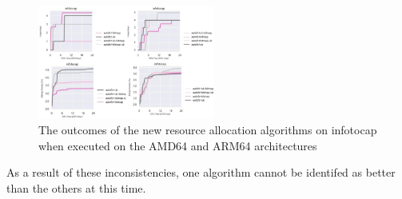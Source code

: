 \begin{figure}

    \includegraphics[width=0.52\textwidth]{figs/infotocap_algo_compare.png}
    \centering
    \caption{The outcomes of the new resource allocation algorithms on infotocap when executed on the AMD64 and ARM64 architectures}
    \label{figs:infotocap_algo_compare.png}
\end{figure}

As a result of these inconsistencies, one algorithm cannot be identifed as better than the others at this time.


